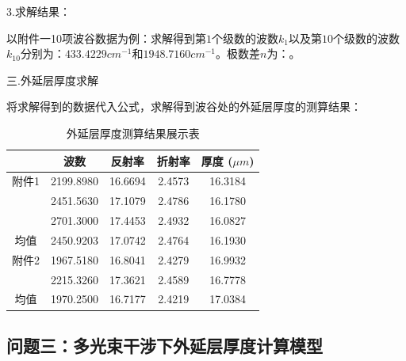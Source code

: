 \documentclass[UTF8]{ctexart}
\begin{document}
3.求解结果：\par 
以附件一10项波谷数据为例：求解得到第$1$个级数的波数$k_1$以及第$10$个级数的波数$k_10$分别为：$433.4229cm^{-1}$和$1948.7160 cm^{-1}$。极数差$n$为：。\par 
三.外延层厚度求解\par 
将求解得到的数据代入公式，求解得到波谷处的外延层厚度的测算结果：\par 
\begin{table}[H]
	\caption{外延层厚度测算结果展示表}
	\centering
	\renewcommand{\tabcolsep}{25pt}
	\begin{tabular}{ccccc}
		\toprule[1.5pt]
	 ~ & 波数 & 反射率 & 折射率 & 厚度 ($\mu m$) \\ 
		\midrule[1pt]
	附件1 & 2199.8980  & 16.6694  & 2.4573  & 16.3184   \\ 
	~ & 2451.5630  & 17.1079  & 2.4786  & 16.1780   \\ 
	~ & 2701.3000  & 17.4453  & 2.4932  & 16.0827 \\ 
	均值 & 2450.9203  & 17.0742  & 2.4764  & 16.1930  \\ 
 
	附件2& 1967.5180  & 16.8041  & 2.4279  & 16.9932   \\ 
	~ & 2215.3260  & 17.3621  & 2.4589  & 16.7778  \\ 
	均值 & 1970.2500  & 16.7177  & 2.4219  &17.0384   \\ 
		\bottomrule[1pt]
	\end{tabular}
\end{table}
\subsection{问题三：多光束干涉下外延层厚度计算模型}
\end{document}
